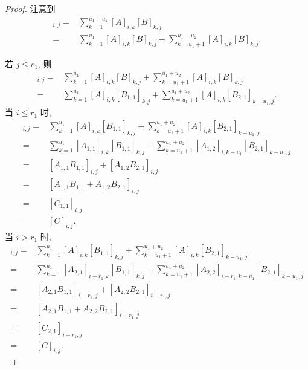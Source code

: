 \begin{proof}
    注意到
    \begin{align*}
        [AB]_{i,j}
        = {} &
        \sum_{k=1}^{u_1+u_2}
        {[A]_{i,k} [B]_{k,j}}
        \\
        = {} &
        \sum_{k=1}^{u_1}
        {[A]_{i,k} [B]_{k,j}}
        +
        \sum_{k=u_1+1}^{u_1+u_2}
        {[A]_{i,k} [B]_{k,j}}.
    \end{align*}

    若 \(j \leq c_1\), 则
    \begin{align*}
        [AB]_{i,j}
        = {} &
        \sum_{k=1}^{u_1}
        {[A]_{i,k} [B]_{k,j}}
        +
        \sum_{k=u_1+1}^{u_1+u_2}
        {[A]_{i,k} [B]_{k,j}}
        \\
        = {} &
        \sum_{k=1}^{u_1}
        {[A]_{i,k} [B_{1,1}]_{k,j}}
        +
        \sum_{k=u_1+1}^{u_1+u_2}
        {[A]_{i,k} [B_{2,1}]_{k-u_1,j}}.
    \end{align*}
    当 \(i \leq r_1\) 时,
    \begin{align*}
        [AB]_{i,j}
        = {} &
        \sum_{k=1}^{u_1}
        {[A]_{i,k} [B_{1,1}]_{k,j}}
        +
        \sum_{k=u_1+1}^{u_1+u_2}
        {[A]_{i,k} [B_{2,1}]_{k-u_1,j}}
        \\
        = {} &
        \sum_{k=1}^{u_1}
        {[A_{1,1}]_{i,k} [B_{1,1}]_{k,j}}
        +
        \sum_{k=u_1+1}^{u_1+u_2}
        {[A_{1,2}]_{i,k-u_1} [B_{2,1}]_{k-u_1,j}}
        \\
        = {} &
        [A_{1,1} B_{1,1}]_{i,j}
        + [A_{1,2} B_{2,1}]_{i,j}
        \\
        = {} &
        [A_{1,1} B_{1,1} + A_{1,2} B_{2,1}]_{i,j}
        \\
        = {} &
        [C_{1,1}]_{i,j}
        \\
        = {} &
        [C]_{i,j}.
    \end{align*}
    当 \(i > r_1\) 时,
    \begin{align*}
        [AB]_{i,j}
        = {} &
        \sum_{k=1}^{u_1}
        {[A]_{i,k} [B_{1,1}]_{k,j}}
        +
        \sum_{k=u_1+1}^{u_1+u_2}
        {[A]_{i,k} [B_{2,1}]_{k-u_1,j}}
        \\
        = {} &
        \sum_{k=1}^{u_1}
        {[A_{2,1}]_{i-r_1,k} [B_{1,1}]_{k,j}}
        +
        \sum_{k=u_1+1}^{u_1+u_2}
        {[A_{2,2}]_{i-r_1,k-u_1} [B_{2,1}]_{k-u_1,j}}
        \\
        = {} &
        [A_{2,1} B_{1,1}]_{i-r_1,j}
        + [A_{2,2} B_{2,1}]_{i-r_1,j}
        \\
        = {} &
        [A_{2,1} B_{1,1} + A_{2,2} B_{2,1}]_{i-r_1,j}
        \\
        = {} &
        [C_{2,1}]_{i-r_1,j}
        \\
        = {} &
        [C]_{i,j}.
    \end{align*}


\end{proof}
